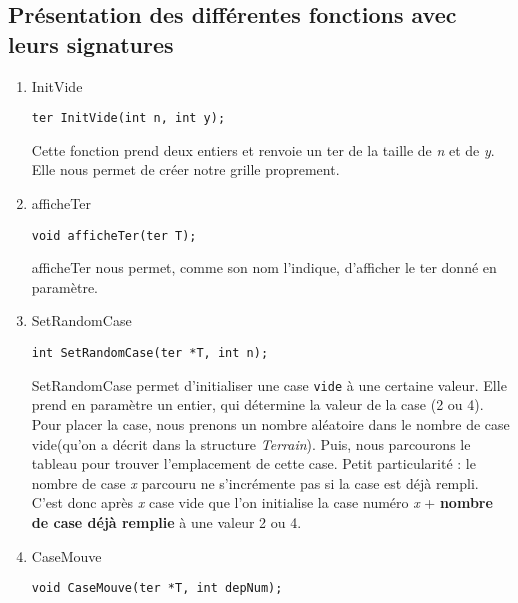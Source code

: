 \documentclass[letter]{article}
\begin{document}
\subsection{Présentation des différentes fonctions  avec leurs signatures}
\label{sec:orgd496a5c}

\begin{enumerate}
\item InitVide
\label{sec:org81e2535}

\begin{verbatim}
ter InitVide(int n, int y);
\end{verbatim}

Cette fonction prend deux entiers et renvoie un ter de la taille de \emph{n} et de \emph{y}.
Elle nous permet de créer notre grille proprement.

\item afficheTer
\label{sec:org3c729dd}

\begin{verbatim}
void afficheTer(ter T);
\end{verbatim}

afficheTer nous permet, comme son nom l'indique, d'afficher le ter donné en paramètre.

\item SetRandomCase
\label{sec:orgc1d752d}

\begin{verbatim}
int SetRandomCase(ter *T, int n);
\end{verbatim}

SetRandomCase permet d'initialiser une case \texttt{vide} à une certaine valeur. Elle prend en paramètre un entier, qui détermine la valeur de la case (2 ou 4). \\
Pour placer la case, nous prenons un nombre aléatoire dans le nombre de case vide(qu'on a décrit dans la structure \emph{Terrain}). Puis, nous parcourons le tableau pour trouver l'emplacement de cette case. Petit particularité : le nombre de case \emph{x} parcouru ne s'incrémente pas si la case est déjà rempli. C'est donc après \emph{x} case vide que l'on initialise la case numéro \emph{x} + \textbf{nombre de case déjà remplie} à une valeur 2 ou 4.

\item CaseMouve
\label{sec:org321129a}

\begin{verbatim}
void CaseMouve(ter *T, int depNum);
\end{verbatim}


\end{enumerate}
\end{document}

